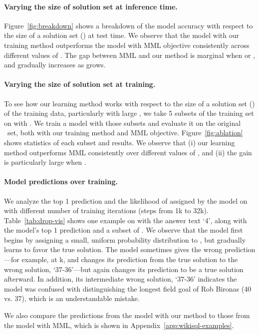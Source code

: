 \documentclass[11pt,a4paper]{article}
\begin{document}
\paragraph{\textbf{Varying the size of solution set at inference time.}} Figure~\ref{fig:breakdown} shows a breakdown of the model accuracy with respect to the size of a solution set () at test time.
We observe that the model with our training method outperforms the model with MML objective consistently across different values of .
The gap between MML and our method is marginal when  or , and gradually increases as  grows.

\paragraph{\textbf{Varying the size of solution set at training.}} To see how our learning method works with respect to the size of a solution set () of the training data, particularly with large , we take 5 subsets of the training set on \wikisql{} with . We train a model with those subsets and evaluate it on the original \dev\ set, both with our training method and MML objective. Figure~\ref{fig:ablation} shows statistics of each subset and results. We observe that (i) our learning method outperforms MML consistently over different values of , and (ii) the gain is particularly large when .

\paragraph{Model predictions over training.} We analyze the top 1 prediction and the likelihood of  assigned by the model on \drop with different number of training iterations (steps from 1k to 32k). 
Table~\ref{tab:drop-vis} shows one example on \drop with the answer text `4', along with the model's top 1 prediction and a subset of .
We observe that the model first begins by assigning a small, uniform probability distribution to , but gradually learns to favor the true solution. The model sometimes gives the wrong prediction---for example, at k, and changes its prediction from the true solution to the wrong solution, `37-36'---but again changes its prediction to be a true solution afterward. In addition, its intermediate wrong solution, `37-36' indicates the model was confused with distinguishing the longest field goal of Rob Bironas (40 vs. 37), which is an understandable mistake.

We also compare the predictions from the model with our method to those from the model with MML, which is shown in Appendix~\ref{app:wikisql-examples}.
\end{document}
